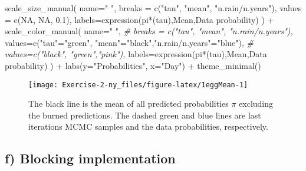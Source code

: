 \documentclass[
]{article}
\newenvironment{Shaded}{\begin{snugshade}}{\end{snugshade}}
\newcommand{\AttributeTok}[1]{\textcolor[rgb]{0.77,0.63,0.00}{#1}}
\newcommand{\CommentTok}[1]{\textcolor[rgb]{0.56,0.35,0.01}{\textit{#1}}}
\newcommand{\ConstantTok}[1]{\textcolor[rgb]{0.00,0.00,0.00}{#1}}
\newcommand{\FloatTok}[1]{\textcolor[rgb]{0.00,0.00,0.81}{#1}}
\newcommand{\FunctionTok}[1]{\textcolor[rgb]{0.00,0.00,0.00}{#1}}
\newcommand{\NormalTok}[1]{#1}
\newcommand{\OtherTok}[1]{\textcolor[rgb]{0.56,0.35,0.01}{#1}}
\newcommand{\SpecialCharTok}[1]{\textcolor[rgb]{0.00,0.00,0.00}{#1}}
\newcommand{\StringTok}[1]{\textcolor[rgb]{0.31,0.60,0.02}{#1}}
\begin{document}
\begin{Shaded}
\begin{Highlighting}[]
  \FunctionTok{scale\_size\_manual}\NormalTok{(}
    \AttributeTok{name=}\StringTok{" "}\NormalTok{,}
    \AttributeTok{breaks =} \FunctionTok{c}\NormalTok{(}\StringTok{"tau"}\NormalTok{, }\StringTok{"mean"}\NormalTok{, }\StringTok{"n.rain/n.years"}\NormalTok{),}
    \AttributeTok{values =} \FunctionTok{c}\NormalTok{(}\ConstantTok{NA}\NormalTok{, }\ConstantTok{NA}\NormalTok{, }\FloatTok{0.1}\NormalTok{),}
    \AttributeTok{labels=}\FunctionTok{expression}\NormalTok{(pi}\SpecialCharTok{*}\NormalTok{(tau),}\StringTok{\textquotesingle{}Mean\textquotesingle{}}\NormalTok{,}\StringTok{\textquotesingle{}Data probability\textquotesingle{}}\NormalTok{)}
\NormalTok{    ) }\SpecialCharTok{+}
  \FunctionTok{scale\_color\_manual}\NormalTok{(}
    \AttributeTok{name=}\StringTok{" "}\NormalTok{,}
    \CommentTok{\# breaks = c("tau", "mean", "n.rain/n.years"),}
    \AttributeTok{values=}\FunctionTok{c}\NormalTok{(}\StringTok{"tau"}\OtherTok{=}\StringTok{"green"}\NormalTok{, }\StringTok{"mean"}\OtherTok{=}\StringTok{"black"}\NormalTok{,}\StringTok{"n.rain/n.years"}\OtherTok{=}\StringTok{"blue"}\NormalTok{),}
    \CommentTok{\# values=c("black", "green","pink"),}
    \AttributeTok{labels=}\FunctionTok{expression}\NormalTok{(pi}\SpecialCharTok{*}\NormalTok{(tau),}\StringTok{\textquotesingle{}Mean\textquotesingle{}}\NormalTok{,}\StringTok{\textquotesingle{}Data probability\textquotesingle{}}\NormalTok{)}
\NormalTok{  ) }\SpecialCharTok{+}
  \FunctionTok{labs}\NormalTok{(}\AttributeTok{y=}\StringTok{"Probabilities"}\NormalTok{, }\AttributeTok{x=}\StringTok{"Day"}\NormalTok{) }\SpecialCharTok{+}
  \FunctionTok{theme\_minimal}\NormalTok{()}
\end{Highlighting}
\end{Shaded}

\begin{figure}

{\centering \texttt{[image: Exercise-2-ny\_files/figure-latex/1eggMean-1]} 

}

\caption{The black line is the mean of all predicted probabilities $\pi$ excluding the burned predictions. The dashed green and blue lines are last iterations MCMC samples and the data probabilities, respectively.}\label{fig:1eggMean}
\end{figure}

\hypertarget{f-blocking-implementation}{%
\subsection{f) Blocking implementation}\label{f-blocking-implementation}}
\end{document}
